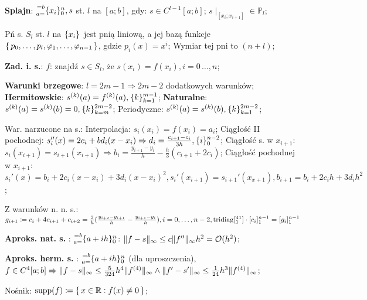 
\entry
\textbf{Splajn}:
$\ipoints[0][n][a=][=b]{x_i}, s$
st. $l$ na $[a;b]$, gdy:
$s\in C^{l-1}[a;b]$;
$s\mid_{[x_i;x_{i+1}]} \in \mathbb{P}_l$;

\entry
Pń s. $S_l$ st. $l$ na $\ipoints{x_i}$ jest pnią liniową,
a jej bazą funkcje
$\set{p_0, \ldots, p_l, \varphi_1, \ldots, \varphi_{n-1}}$,
gdzie $p_i(x)=x^i$;
\entry
Wymiar tej pni to $(n+l)$;

\entry
\textbf{Zad. i. s.}:
$f$: znajdź $s\in S_l$, że
$s(x_i)=f(x_i), i=0\,\dots,n$;

\entry
\textbf{Warunki brzegowe}:
$l=2m-1 \Rightarrow 2m-2$ dodatkowych warunków;
\entry
\textbf{Hermitowskie}:
$\deriv{s}{k}(a) = \deriv{f}{k}(a), \ipoints[k=1][m-1]{k}$;
\entry
\textbf{Naturalne}:
$\deriv{s}{k}(a)=\deriv{s}{k}(b)=0, \ipoints[k=m][2m-2]{k}$;
\entry
Periodyczne:
$\deriv{s}{k}(a)=\deriv{s}{k}(b), \ipoints[k=1][2m-2]{k}$;

\entry
War. narzucone na s.:
Interpolacja:
$s_i(x_i)=f(x_i)=a_i$;
Ciągłość II pochodnej:
$s_i''(x) = 2c_i+bd_i(x-x_i) \Rightarrow d_i=\frac{c_{i+1} - c_i}{3h}, \ipoints[0][n-2]{i}$;
Ciągłość s. w $x_{i+1}$:
$s_i(x_{i+1}) = s_{i+1}(x_{i+1}) \Rightarrow b_i = \frac{y_{i+1} - y_i}{h} - \frac{h}{3}(c_{i+1} + 2c_i)$;
Ciągłość pochodnej w $x_{i+1}$:
$
s_i'(x) = b_i +2c_i(x - x_i) + 3 d_i (x - x_i)^2,
s_i'(x_{i+1}) = s_{i+1}'(x_{x+1}),
b_{i+1} = b_i + 2 c_i h + 3 d_i h^2
$;

\entry
Z warunków n. n. s.:
$
g_{i+1} \coloneqq
c_i + 4c_{i+1} + c_{i+2} =
\frac{3}{h}(\frac{y_{i+2} - y_{i+1}}{h} - \frac{y_{i+1} - y_{i}}{h}),
i=0,\ldots, n-2,
\mathrm{tridiag}[\prescript{4}{1}{}^{1}] \cdot [c_i]^{n-1}_{1} = [g_i]^{n-1}_{1}
$

\entry
\textbf{Aproks. nat. s. \mancube}:
$\ipoints[0][n][a=][=b]{a+ih}$:
$\|f-s\|_\infty \leq c\|f''\|_\infty h^2 = \mathcal{O}(h^2)$;

\entry
\textbf{Aproks. herm. s. \mancube}:
$\ipoints[0][n][a=][=b]{a+ih}$
(dla uproszczenia),
$
f\in C^{4}[a;b]
\Rightarrow
\|f-s\|_\infty \leq \frac{5}{324} h^4 \|f^{(4)}\|_\infty
\wedge
\|f'-s'\|_\infty \leq \frac{1}{24} h^3 \|f^{(4)}\|_\infty
$;


\entry
Nośnik:
$\mathrm{supp}(f) \coloneqq \set{x \in \mathbb{R}: f(x) \neq 0}$;
